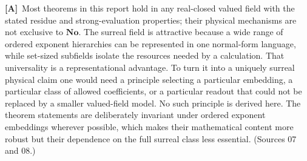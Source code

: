 \documentclass[11pt,oneside]{article}
\numberwithin{equation}{section}
\theoremstyle{plain}
\theoremstyle{definition}
\theoremstyle{remark}
\newcommand{\No}{\mathbf{No}}
\newcommand{\TA}{\textcolor{TierA}{\textsf{\bfseries[A]}}}
\begin{document}
\TA\ Most theorems in this report hold in any real-closed valued field with the stated residue and strong-evaluation properties; their physical mechanisms are not exclusive to $\No$. The surreal field is attractive because a wide range of ordered exponent hierarchies can be represented in one normal-form language, while set-sized subfields isolate the resources needed by a calculation. That universality is a representational advantage. To turn it into a uniquely surreal physical claim one would need a principle selecting a particular embedding, a particular class of allowed coefficients, or a particular readout that could not be replaced by a smaller valued-field model. No such principle is derived here. The theorem statements are deliberately invariant under ordered exponent embeddings wherever possible, which makes their mathematical content more robust but their dependence on the full surreal class less essential. (Sources 07 and 08.)
\end{document}
